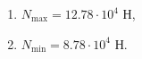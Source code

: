 \begin{enumerate}
\item $N_{\max} = 12.78\cdot 10^4$ Н,
\item $N_{\min} = 8.78\cdot 10^4$ Н.
\end{enumerate}
